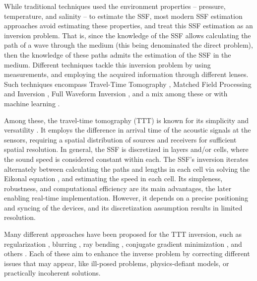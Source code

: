 While traditional techniques used the environment properties -- pressure, temperature, and salinity -- to estimate the SSF, most modern SSF estimation approaches avoid estimating these properties, and treat this SSF estimation as an inversion problem. That is, since the knowledge of the SSF allows calculating the path of a wave through the medium (this being denominated the direct problem), then the knowledge of these paths admits the estimation of the SSF in the medium. Different techniques tackle this inversion problem by using measurements, and employing the acquired information through different lenses. Such techniques encompass Travel-Time Tomography \cite{bormann_seismic_2012,stefanov_travel_2019}, Matched Field Processing \cite{gemba_adaptive_2017,brienzo_broadband_1993} and Inversion \cite{dosso_bayesian_2011}, Full Waveform Inversion \cite{virieux_overview_2009,fichtner_multiscale_2013}, and a mix among these \cite{treister_full_2017} or with machine learning \cite{zhang_bayesian_2021}.

Among these, the travel-time tomography (TTT) is known for its simplicity and versatility \cite{aki_determination_1977,dines_computerized_1979,phillips_traveltime_1991}. It employs the difference in arrival time of the acoustic signals at the sensors, requiring a spatial distribution of sources and receivers for sufficient spatial resolution. In general, the SSF is discretized in layers and/or cells, where the sound speed is considered constant within each. The SSF's inversion iterates alternately between calculating the paths and lengths in each cell via solving the Eikonal equation \cite{sethian_fast_1999,chopp_improvements_2001,zhao_fast_2004,tang_travel_2024}, and estimating the speed in each cell. Its simpleness, robustness, and computational efficiency are its main advantages, the later enabling real-time implementation. However, it depends on a precise positioning and syncing of the devices, and its discretization assumption results in limited resolution.

Many different approaches have been proposed for the TTT inversion, such as regularization \cite{aki_determination_1976,aki_determination_1977}, blurring \cite{phillips_traveltime_1991,ali_opensource_2019}, ray bending \cite{jeong_investigating_2024,hormati_robust_2010}, conjugate gradient minimization \cite{zhang_nonlinear_1998,tang_travel_2024}, and others \cite{zhang_nonlinear_1998,jeong_investigating_2024}. Each of these aim to enhance the inverse problem by correcting different issues that may appear, like ill-posed problems, physics-defiant models, or practically incoherent solutions.

